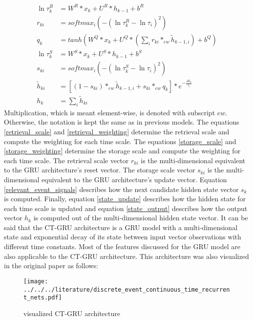 \documentclass[draft,final]{vutinfth} %
\begin{document}
    \begin{align}
    \label{retrieval_scale}
    \ln{\tau_k^R} &= W^R*x_k + U^R*h_{k-1} + b^R \\
    \label{retrieval_weighting}
    r_{ki} &= softmax_i(-(\ln{\tau_k^R-\ln{\tau_i}})^2) \\
    \label{relevant_event_signals}
    q_k &= tanh(W^Q*x_k + U^Q*(\sum_i {r_{ki} *_{ew} \tilde{h}_{k-1,i}}) + b^Q) \\
    \label{storage_scale}
    \ln{\tau_k^S} &= W^S*x_k + U^S*h_{k-1} + b^S \\
    \label{storage_weighting}
    s_{ki} &= softmax_i(-(\ln{\tau_k^S-\ln{\tau_i}})^2) \\
    \label{state_update}
    \tilde{h}_{ki} &= [(1 - s_{ki}) *_{ew} \tilde{h}_{k-1,i} + s_{ki} *_{ew} q_k] * e^{-\frac{\Delta t_k}{\tau_i}} \\
    \label{state_output}
    h_k &= \sum_i{\tilde{h}_{ki}}
    \end{align}
    Multiplication, which is meant element-wise, is denoted with subscript $ew$. Otherwise, the notation is kept the same as in previous models.
    The equations \ref{retrieval_scale} and \ref{retrieval_weighting} determine the retrieval scale and compute the weighting for each time scale.
    The equations \ref{storage_scale} and \ref{storage_weighting} determine the storage scale and compute the weighting for each time scale.
    The retrieval scale vector $r_{ki}$ is the multi-dimensional equivalent to the GRU architecture's reset vector. The storage scale vector $s_{ki}$ is the multi-dimensional equivalent to the GRU architecture’s update vector.
    Equation \ref{relevant_event_signals} describes how the next candidate hidden state vector $s_k$ is computed.
    Finally, equation \ref{state_update} describes how the hidden state for each time scale is updated and equation \ref{state_output} describes how the output vector $h_k$ is computed out of the multi-dimensional hidden state vector.
    It can be said that the CT-GRU architecture is a GRU model with a multi-dimensional state and exponential decay of its state between input vector observations with different time constants.
    Most of the features discussed for the GRU model are also applicable to the CT-GRU architecture.
    This architecture was also visualized in the original paper as follows:
    \begin{figure}[H]
        \centering{}
        \texttt{[image: ../../../literature/discrete\_event\_continuous\_time\_recurrent\_nets.pdf]}
        \caption{visualized CT-GRU architecture \cite[p. 4]{CTGRU}}
        \label{fig:ct_gru_vis}
    \end{figure}
\end{document}

